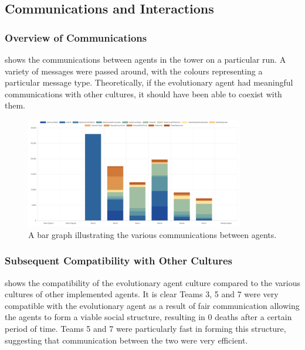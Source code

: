 \subsection{Communications and Interactions}

\subsubsection{Overview of Communications}
 shows the communications between agents in the tower on a particular run. A variety of messages were passed around, with the colours representing a particular message type. Theoretically, if the evolutionary agent had meaningful communications with other cultures, it should have been able to coexist with them.

\begin{figure}[htb]
    \centering
    \includegraphics[width=0.85\textwidth]{006_team_4_agent_design/assets/communications_chart.png}
    \caption{A bar graph illustrating the various communications between agents.}
    \label{fig:commsChart}
\end{figure}

\subsubsection{Subsequent Compatibility with Other Cultures}
 shows the compatibility of the evolutionary agent culture compared to the various cultures of other implemented agents. It is clear Teams 3, 5 and 7 were very compatible with the evolutionary agent as a result of fair communication allowing the agents to form a viable social structure, resulting in 0 deaths after a certain period of time. Teams 5 and 7 were particularly fast in forming this structure, suggesting that communication between the two were very efficient.

